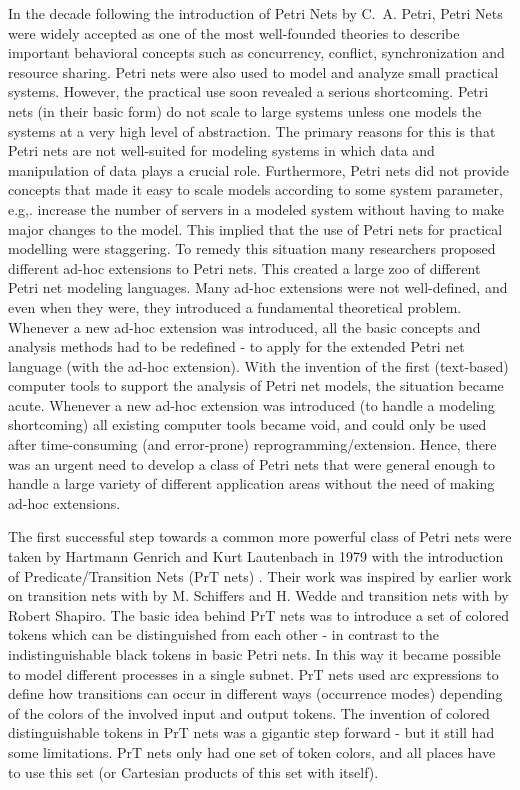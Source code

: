 
In the decade following the introduction of Petri Nets by C.~A. Petri,
Petri Nets were widely accepted as one of the most well-founded
theories to describe important behavioral concepts such as
concurrency, conflict, synchronization and resource sharing. Petri
nets were also used to model and analyze small practical
systems. However, the practical use soon revealed a serious
shortcoming. Petri nets (in their basic form) do not scale to large
systems unless one models the systems at a very high level of
abstraction. The primary reasons for this is that Petri nets are not
well-suited for modeling systems in which data and manipulation of
data plays a crucial role. Furthermore, Petri nets did not provide
concepts that made it easy to scale models according to some system
parameter, e.g,. increase the number of servers in a modeled system
without having to make major changes to the model. This implied that
the use of Petri nets for practical modelling were staggering. To
remedy this situation many researchers proposed different ad-hoc
extensions to Petri nets. This created a large zoo of different Petri
net modeling languages. Many ad-hoc extensions were not well-defined,
and even when they were, they introduced a fundamental theoretical
problem. Whenever a new ad-hoc extension was introduced, all the basic
concepts and analysis methods had to be redefined - to apply for the
extended Petri net language (with the ad-hoc extension). With the
invention of the first (text-based) computer tools to support the
analysis of Petri net models, the situation became acute. Whenever a
new ad-hoc extension was introduced (to handle a modeling shortcoming)
all existing computer tools became void, and could only be used after
time-consuming (and error-prone) reprogramming/extension. Hence, there
was an urgent need to develop a class of Petri nets that were general
enough to handle a large variety of different application areas
without the need of making ad-hoc extensions.

The first successful step towards a common more powerful class of
Petri nets were taken by Hartmann Genrich and Kurt Lautenbach in 1979
with the introduction of Predicate/Transition Nets (PrT nets)
\cite{genrich:81}. Their work was inspired by earlier work on
transition nets with  by M. Schiffers and
H. Wedde \cite{X} and transition nets with  \cite{Y} by Robert Shapiro. The basic idea behind PrT
nets was to introduce a set of colored tokens which can be
distinguished from each other - in contrast to the indistinguishable
black tokens in basic Petri nets. In this way it became possible to
model different processes in a single subnet. PrT nets used arc
expressions to define how transitions can occur in different ways
(occurrence modes) depending of the colors of the involved input and
output tokens. The invention of colored distinguishable tokens in PrT
nets was a gigantic step forward - but it still had some
limitations. PrT nets only had one set of token colors, and all places
have to use this set (or Cartesian products of this set with itself).

